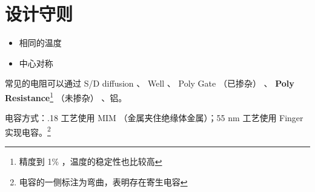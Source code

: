 \documentclass[cn,11pt,chinese,black,simple]{../elegantbook}
\begin{document}
\section{设计守则}

\begin{itemize}
    \item 相同的温度
    \item 中心对称
\end{itemize}

常见的电阻可以通过 S/D diffusion 、 Well 、 Poly Gate （已掺杂） 、 \textbf{Poly Resistance}\footnote{精度到 1\% ，温度的稳定性也比较高} （未掺杂） 、铝。

电容方式：.18 工艺使用 MIM （金属夹住绝缘体金属）；55 nm 工艺使用 Finger 实现电容。\footnote{电容的一侧标注为弯曲，表明存在寄生电容}






\let\chapname\undefined
\ifx\mainclass\undefined
\end{document}
